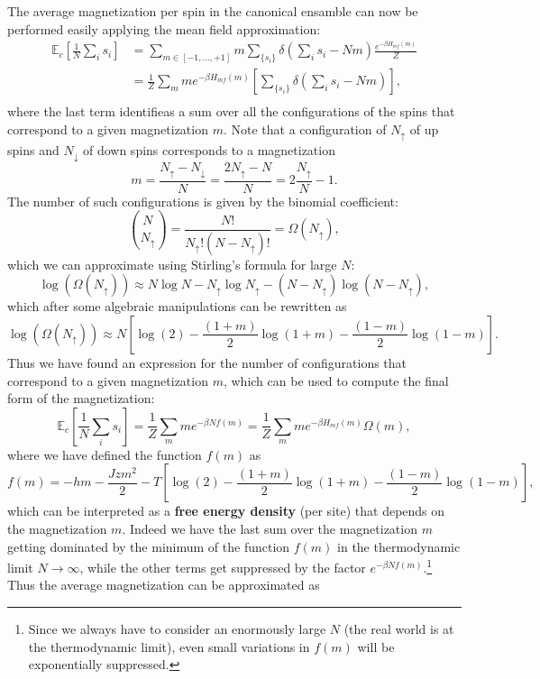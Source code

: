 The average magnetization per spin in the canonical ensamble can now be performed easily applying the mean field approximation:
\[
    \begin{aligned}
        \mathbb{E}_c\left[ \frac{1}{N} \sum_{i} s_i \right] & = \sum_{m \in [-1, \ldots, +1]} m \sum_{\{s_i\}} \delta\left(\sum_{i} s_i - Nm\right) \frac{e^{-\beta H_{mf}(m)}}{Z} \\
                                                            & = \frac{1}{Z} \sum_{m} m e^{-\beta H_{mf}(m)} \left[ \sum_{\{s_i\}} \delta\left(\sum_{i} s_i - Nm\right) \right],    \\
    \end{aligned}
\]
where the last term identifieas a sum over all the configurations of the spins that correspond to a given magnetization \(m\). Note that a configuration of \(N_{\uparrow}\) of up spins and \(N_{\downarrow}\) of down spins corresponds to a magnetization
\[
    m = \frac{N_{\uparrow} - N_{\downarrow}}{N} = \frac{2 N_{\uparrow} - N}{N} = 2 \frac{N_{\uparrow}}{N} - 1.
\]
The number of such configurations is given by the binomial coefficient:
\[
    \binom{N}{N_{\uparrow}} = \frac{N!}{N_{\uparrow}! (N - N_{\uparrow})!} = \Omega(N_\uparrow),
\]
which we can approximate using Stirling's formula for large \(N\):
\[
    \log(\Omega(N_\uparrow)) \approx N \log N - N_{\uparrow} \log N_{\uparrow} - (N - N_{\uparrow}) \log (N - N_{\uparrow}),
\]
which after some algebraic manipulations can be rewritten as
\[
    \log(\Omega(N_\uparrow)) \approx N \left[ \log(2) - \frac{(1+m)}{2}\log (1+m) - \frac{(1-m)}{2}\log (1-m) \right].
\]
Thus we have found an expression for the number of configurations that correspond to a given magnetization \(m\), which can be used to compute the final form of the magnetization:
\[
    \mathbb{E}_c \left[ \frac{1}{N} \sum_{i} s_i \right] = \frac{1}{Z} \sum_{m} m e^{-\beta N f(m)} = \frac{1}{Z} \sum_{m} m e^{-\beta H_{mf}(m)} \Omega(m),
\]
where we have defined the function \(f(m)\) as
\[
    f(m) = - hm - \frac{Jzm^2}{2} - T \left[ \log(2) - \frac{(1+m)}{2}\log (1+m) - \frac{(1-m)}{2}\log (1-m) \right],
\]
which can be interpreted as a \textbf{free energy density} (per site) that depends on the magnetization \(m\). Indeed we have the last sum over the magnetization \(m\) getting dominated by the minimum of the function \(f(m)\) in the thermodynamic limit \(N \to \infty\), while the other terms get suppressed by the factor \(e^{-\beta N f(m)}\).\footnote{Since we always have to consider an enormously large \(N\) (the real world is at the thermodynamic limit), even small variations in \(f(m)\) will be exponentially suppressed.} Thus the average magnetization can be approximated as
